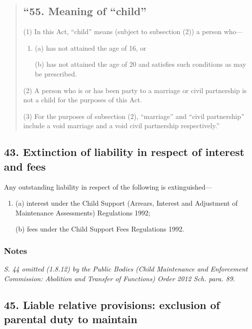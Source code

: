 \documentclass[a4paper]{article}
\newcommand\amendment[1]{\subsubsection*{Notes}{\itshape\frenchspacing\footnotesize #1 \par}}
\begin{document}
\begin{quotation}
\subsection*{``55. Meaning of ``child''}

(1) In this Act, “child” means (subject to subsection (2)) a person who---
\begin{enumerate}\item[]
(a) has not attained the age of 16, or

(b) has not attained the age of 20 and satisfies such conditions as may be prescribed.
\end{enumerate}

(2)
A person who is or has been party to a marriage or civil partnership is not a child for the purposes of this Act.

(3)
For the purposes of subsection (2), “marriage” and “civil partnership” include a void marriage and a void civil partnership respectively.''
\end{quotation}

\subsection{43. Extinction of liability in respect of interest and fees}

Any outstanding liability in respect of the following is extinguished—
\begin{enumerate}\item[]
(a) interest under the Child Support (Arrears, Interest and Adjustment of Maintenance Assessments) Regulations 1992;

(b) fees under the Child Support Fees Regulations 1992.
\end{enumerate}

%

\amendment{
S. 44 omitted (1.8.12) by the Public Bodies (Child Maintenance and Enforcement Commission: Abolition and Transfer of Functions) Order 2012 Sch. para. 89.
}

\subsection{45. Liable relative provisions: exclusion of parental duty to maintain}
\end{document}
